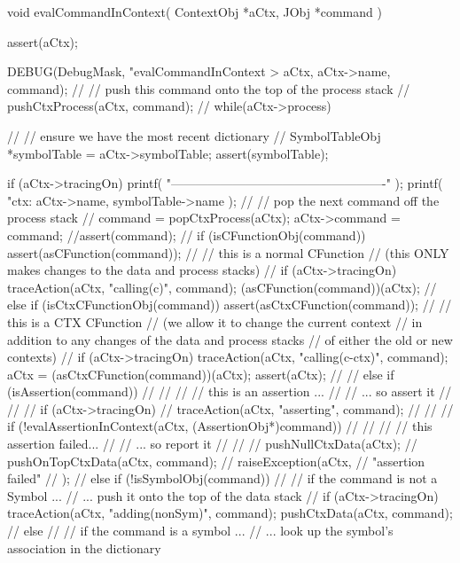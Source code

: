 void evalCommandInContext(
  ContextObj *aCtx,
  JObj       *command
) {
  assert(aCtx);
  
  DEBUG(DebugMask, "evalCommandInContext > %
    aCtx, aCtx->name, command);
  //
  // push this command onto the top of the process stack
  //
  pushCtxProcess(aCtx, command);
  //
  while(aCtx->process) {
    //
    // ensure we have the most recent dictionary
    //
    SymbolTableObj *symbolTable = aCtx->symbolTable;
    assert(symbolTable);
    
    if (aCtx->tracingOn) {
      printf(
        "\n----------------------------------------------------\n"
      );
      printf(
        "ctx: %
        aCtx->name, symbolTable->name
      );
    }
    //
    // pop the next command off the process stack
    //
    command = popCtxProcess(aCtx);
    aCtx->command = command;
    //assert(command);
    //
    if (isCFunctionObj(command)) {
      assert(asCFunction(command));
      //
      // this is a normal CFunction
      // (this ONLY makes changes to the data and process stacks)
      //
      if (aCtx->tracingOn)
        traceAction(aCtx, "calling(c)", command);
      (asCFunction(command))(aCtx);
      //
    } else if (isCtxCFunctionObj(command)) {
        assert(asCtxCFunction(command));
        //
        // this is a CTX CFunction
        // (we allow it to change the current context
        //  in addition to any changes of the data and process stacks
        //  of either the old or new contexts)
        //
        if (aCtx->tracingOn) 
          traceAction(aCtx, "calling(c-ctx)", command);
        aCtx = (asCtxCFunction(command))(aCtx);
        assert(aCtx);
        //    
//    } else if (isAssertion(command)) {
//      //
//      // this is an assertion ...
//      //   ... so assert it 
//      //
//      if (aCtx->tracingOn) 
//        traceAction(aCtx, "asserting", command);
//      //
//      if (!evalAssertionInContext(aCtx, (AssertionObj*)command)) {
//        //
//        // this assertion failed... 
//        //   ... so report it
//        //
//        pushNullCtxData(aCtx);
//        pushOnTopCtxData(aCtx, command);
//        raiseException(aCtx,
//          "assertion failed"
//        );
//      }
    } else if (!isSymbolObj(command)) {
      //
      // if the command is not a Symbol ...
      //  ...  push it onto the top of the data stack
      //
      if (aCtx->tracingOn)
        traceAction(aCtx, "adding(nonSym)", command);
      pushCtxData(aCtx, command);
      //
   } else {
      //
      // if the command is a symbol ...
      //  ... look up the symbol's association in the dictionary
}}}
